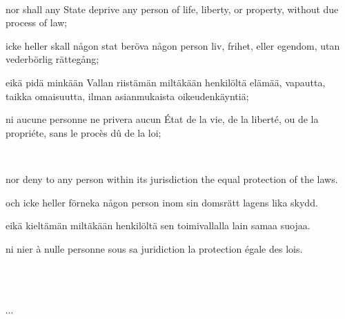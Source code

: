 \documentclass[a4paper,landscape,12pt]{article}
\begin{document}
~

\begin{minipage}[t]{0.22\textwidth}
nor shall any State deprive any person of life, liberty, or property, without due process of law;
\end{minipage}\textwidth
\begin{minipage}[t]{0.22\textwidth}
icke heller skall någon stat beröva någon person liv, frihet, eller egendom, utan vederbörlig rättegång;
\end{minipage}\textwidth
\begin{minipage}[t]{0.22\textwidth}
eikä pidä minkään Vallan riistämän miltäkään henkilöltä elämää, vapautta, taikka omaisuutta, ilman asianmukaista oikeudenkäyntiä;
\end{minipage}\textwidth
\begin{minipage}[t]{0.22\textwidth}
ni aucune personne ne privera aucun État de la vie, de la liberté, ou de la propriéte, sans le procès dû de la loi;
\end{minipage}
	
~

\begin{minipage}[t]{0.22\textwidth}
nor deny to any person within its jurisdiction the equal protection of the laws.
\end{minipage}\textwidth
\begin{minipage}[t]{0.22\textwidth}
och icke heller förneka någon person inom sin domsrätt lagens lika skydd.
\end{minipage}\textwidth
\begin{minipage}[t]{0.22\textwidth}
eikä kieltämän miltäkään henkilöltä sen toimivallalla lain samaa suojaa.
\end{minipage}\textwidth
\begin{minipage}[t]{0.22\textwidth}
ni nier à nulle personne sous sa juridiction la protection égale des lois.
\end{minipage}

~

~
		
$\cdots$
\end{document}
